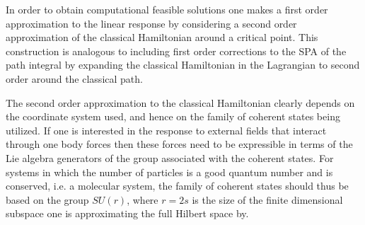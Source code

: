\documentclass[aps,preprint]{revtex4}%
\begin{document}
In order to obtain computational feasible solutions one makes a first order
approximation to the linear response by considering a second order
approximation of the classical Hamiltonian around a critical point. This
construction is analogous to including first order corrections to the SPA of
the path integral by expanding the classical Hamiltonian in the Lagrangian to
second order around the classical path.

The second order approximation to the classical Hamiltonian clearly depends on
the coordinate system used, and hence on the family of coherent states being
utilized. If one is interested in the response to external fields that
interact through one body forces then these forces need to be expressible in
terms of the Lie algebra generators of the group associated with the coherent
states. For systems in which the number of particles is a good quantum number
and is conserved, i.e. a molecular system, the family of coherent states
should thus be based on the group $SU(r)$, where $r=2s$ is the size of the
finite dimensional subspace one is approximating the full Hilbert space by.
\end{document}
